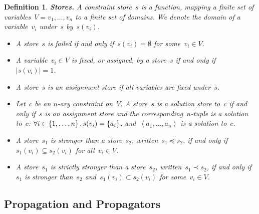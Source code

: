 \documentclass[a4paper,11pt]{article}
\newtheorem{definition}{Definition}
\newcommand{\Dom}[1]{\text{dom}({#1})}
\numberwithin{equation}{section}
\begin{document}
\begin{definition}
  \textbf{Stores.} A \emph{constraint store}~$s$ is a function, mapping a finite set of
  variables~$V = v_1, \ldots, v_n$ to a finite set of domains. We denote the domain of
  a variable~$v_i$ under~$s$ by~$s(v_i)$.%
  \begin{itemize}
    \item A store~$s$ is \emph{failed} if and only if~$s(v_i) = \emptyset$ for some~$v_i \in V$.
    \item   A variable~$v_i \in V$ is \emph{fixed}, or \emph{assigned},
      by a store~$s$ if and only if~$|s(v_i)| = 1$. 
    \item A store~$s$ is an \emph{assignment store} if all variables are 
      fixed under~$s$.

    \item Let~$c$ be an $n$-ary constraint on~$V$.
      A store~$s$ is a \emph{solution store} 
      to~$c$ if and only if~$s$ is an assignment store and the
      corresponding~$n$-tuple is a solution to~$c$:
      $\forall i \in \left\{1,\ldots,n\right\}, s(v_i) = \left\{a_i\right\}$,
      and~$\left<a_1,\ldots,a_n\right>$ is a solution to~$c$.


    \item A store~$s_1$ is \emph{stronger} than a store~$s_2$, 
      written~$s_1 \preceq s_2$, if and only if~$s_1(v_i) \subseteq s_2(v_i)$ 
      for all~$v_i \in V$.
    
    \item A store~$s_1$ is \emph{strictly stronger} than a store~$s_2$, 
      written~$s_1 \prec s_2$, if and only if~$s_1$ is stronger than~$s_2$
      and~$s_1(v_i) \subset s_2(v_i)$ for some~$v_i \in V$. 
      
  \end{itemize}

\end{definition}

\subsection{Propagation and Propagators}
\label{bg:propagation}
\end{document}
